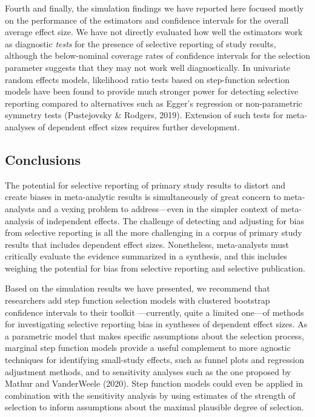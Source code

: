 \documentclass[
  man, donotrepeattitle,floatsintext]{apa7}
\begin{document}
Fourth and finally, the simulation findings we have reported here focused mostly on the performance of the estimators and confidence intervals for the overall average effect size.
We have not directly evaluated how well the estimators work as diagnostic \emph{tests} for the presence of selective reporting of study results, although the below-nominal coverage rates of confidence intervals for the selection parameter suggests that they may not work well diagnostically.
In univariate random effects models, likelihood ratio tests based on step-function selection models have been found to provide much stronger power for detecting selective reporting compared to alternatives such as Egger's regression or non-parametric symmetry tests (Pustejovsky \& Rodgers, 2019).
Extension of such tests for meta-analyses of dependent effect sizes requires further development.

\subsection{Conclusions}\label{conclusions}

The potential for selective reporting of primary study results to distort and create biases in meta-analytic results is simultaneously of great concern to meta-analysts and a vexing problem to address---even in the simpler context of meta-analysis of independent effects.
The challenge of detecting and adjusting for bias from selective reporting is all the more challenging in a corpus of primary study results that includes dependent effect sizes.
Nonetheless, meta-analysts must critically evaluate the evidence summarized in a synthesis, and this includes weighing the potential for bias from selective reporting and selective publication.

Based on the simulation results we have presented, we recommend that researchers add step function selection models with clustered bootstrap confidence intervals to their toolkit ---currently, quite a limited one---of methods for investigating selective reporting bias in syntheses of dependent effect sizes.
As a parametric model that makes specific assumptions about the selection process, marginal step function models provide a useful complement to more agnostic techniques for identifying small-study effects, such as funnel plots and regression adjustment methods, and to sensitivity analyses such as the one proposed by Mathur and VanderWeele (2020). Step function models could even be applied in combination with the sensitivity analysis by using estimates of the strength of selection to inform assumptions about the maximal plausible degree of selection.
\end{document}
